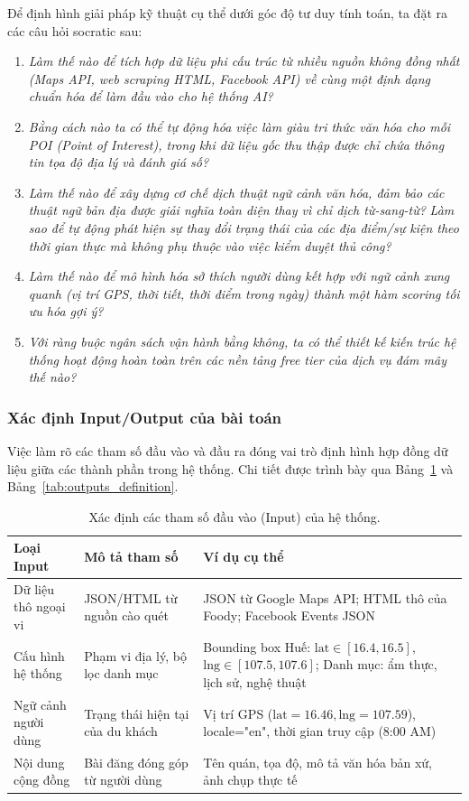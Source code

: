 Để định hình giải pháp kỹ thuật cụ thể dưới góc độ tư duy tính toán, ta đặt ra các câu hỏi socratic sau:
\begin{enumerate}
    \item \textit{Làm thế nào để tích hợp dữ liệu phi cấu trúc từ nhiều nguồn không đồng nhất (Maps API, web scraping HTML, Facebook API) về cùng một định dạng chuẩn hóa để làm đầu vào cho hệ thống AI?}
    \item \textit{Bằng cách nào ta có thể tự động hóa việc làm giàu tri thức văn hóa cho mỗi POI (\textit{Point of Interest}), trong khi dữ liệu gốc thu thập được chỉ chứa thông tin tọa độ địa lý và đánh giá số?}
    \item \textit{Làm thế nào để xây dựng cơ chế dịch thuật ngữ cảnh văn hóa, đảm bảo các thuật ngữ bản địa được giải nghĩa toàn diện thay vì chỉ dịch từ-sang-từ?}
    \textit{Làm sao để tự động phát hiện sự thay đổi trạng thái của các địa điểm/sự kiện theo thời gian thực mà không phụ thuộc vào việc kiểm duyệt thủ công?}
    \item \textit{Làm thế nào để mô hình hóa sở thích người dùng kết hợp với ngữ cảnh xung quanh (vị trí GPS, thời tiết, thời điểm trong ngày) thành một hàm scoring tối ưu hóa gợi ý?}
    \item \textit{Với ràng buộc ngân sách vận hành bằng không, ta có thể thiết kế kiến trúc hệ thống hoạt động hoàn toàn trên các nền tảng free tier của dịch vụ đám mây thế nào?}
\end{enumerate}

\subsubsection{Xác định Input/Output của bài toán}

Việc làm rõ các tham số đầu vào và đầu ra đóng vai trò định hình hợp đồng dữ liệu giữa các thành phần trong hệ thống. Chi tiết được trình bày qua Bảng~\ref{tab:inputs_definition} và Bảng~\ref{tab:outputs_definition}.

\begin{table}[H]
\centering
\begin{tabularx}{\textwidth}{l p{3.2cm} X}
\toprule
\textbf{Loại Input} & \textbf{Mô tả tham số} & \textbf{Ví dụ cụ thể} \\
\midrule
Dữ liệu thô ngoại vi & JSON/HTML từ nguồn cào quét & JSON từ Google Maps API; HTML thô của Foody; Facebook Events JSON \\
Cấu hình hệ thống & Phạm vi địa lý, bộ lọc danh mục & Bounding box Huế: $\text{lat} \in [16.4, 16.5]$, $\text{lng} \in [107.5, 107.6]$; Danh mục: ẩm thực, lịch sử, nghệ thuật \\
Ngữ cảnh người dùng & Trạng thái hiện tại của du khách & Vị trí GPS ($\text{lat}=16.46, \text{lng}=107.59$), locale="en", thời gian truy cập (8:00 AM) \\
Nội dung cộng đồng & Bài đăng đóng góp từ người dùng & Tên quán, tọa độ, mô tả văn hóa bản xứ, ảnh chụp thực tế \\
\bottomrule
\end{tabularx}
\caption{Xác định các tham số đầu vào (Input) của hệ thống.}
\label{tab:inputs_definition}
\end{table}

